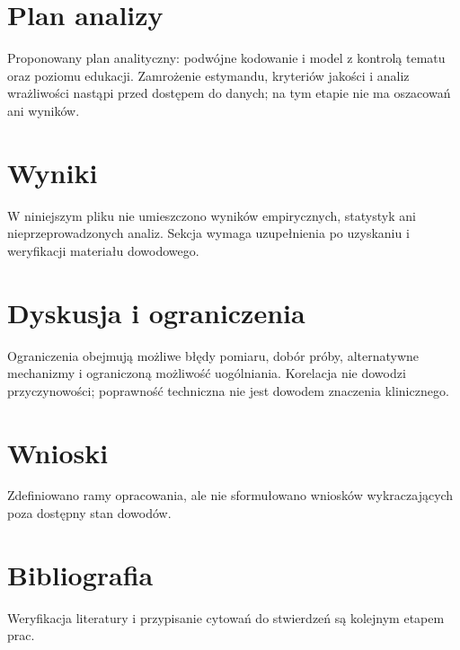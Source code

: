 \documentclass[11pt,a4paper]{article}
\begin{document}
\section{Plan analizy}

Proponowany plan analityczny: podwójne kodowanie i model z kontrolą tematu oraz poziomu edukacji. Zamrożenie estymandu, kryteriów jakości i analiz wrażliwości nastąpi przed dostępem do danych; na tym etapie nie ma oszacowań ani wyników.

\section{Wyniki}

W niniejszym pliku nie umieszczono wyników empirycznych, statystyk ani nieprzeprowadzonych analiz. Sekcja wymaga uzupełnienia po uzyskaniu i weryfikacji materiału dowodowego.

\section{Dyskusja i ograniczenia}

Ograniczenia obejmują możliwe błędy pomiaru, dobór próby, alternatywne mechanizmy i ograniczoną możliwość uogólniania. Korelacja nie dowodzi przyczynowości; poprawność techniczna nie jest dowodem znaczenia klinicznego.

\section{Wnioski}

Zdefiniowano ramy opracowania, ale nie sformułowano wniosków wykraczających poza dostępny stan dowodów.

\section*{Bibliografia}

Weryfikacja literatury i przypisanie cytowań do stwierdzeń są kolejnym etapem prac.
\end{document}
